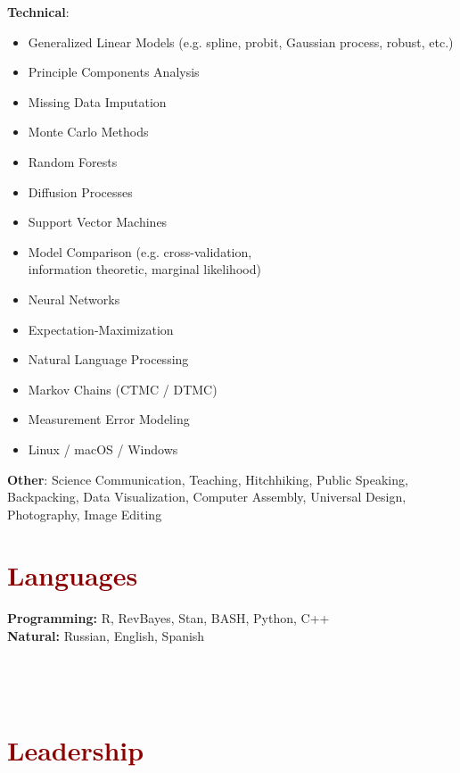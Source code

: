 \documentclass[11pt,margin,line]{resume}
\begin{document}
\begin{resume}
\textbf{Technical}:\vspace{-4.5mm}
\begin{multicols}{2}
    \begin{itemize}
    \setlength\itemsep{-0.2em}
         \item Generalized Linear Models (e.g. spline, probit, Gaussian process, robust, etc.)
         \item Principle Components Analysis
         \item Missing Data Imputation
	\item Monte Carlo Methods
         \item Random Forests
	\item Diffusion Processes
         \item Support Vector Machines
	\item Model Comparison (e.g. cross-validation, \\information theoretic, marginal likelihood)
         \item Neural Networks
	\item Expectation-Maximization
	\item Natural Language Processing
	\item Markov Chains (CTMC / DTMC)
	\item Measurement Error Modeling
	\item Linux / macOS / Windows
    \end{itemize}
    \end{multicols}\vspace{-4.5mm}
\textbf{Other}: Science Communication, Teaching, Hitchhiking, Public Speaking, Backpacking, Data Visualization, Computer Assembly, Universal Design, Photography, Image Editing 

\section{\large\textcolor{DarkRed}{Languages}}

\textbf{Programming:} R, RevBayes, Stan, BASH, Python, C++\\
\textbf{Natural:} Russian, English, Spanish\\\\\\\\


\section{\large\textcolor{DarkRed}{Leadership}}


\end{resume}
\end{document}
